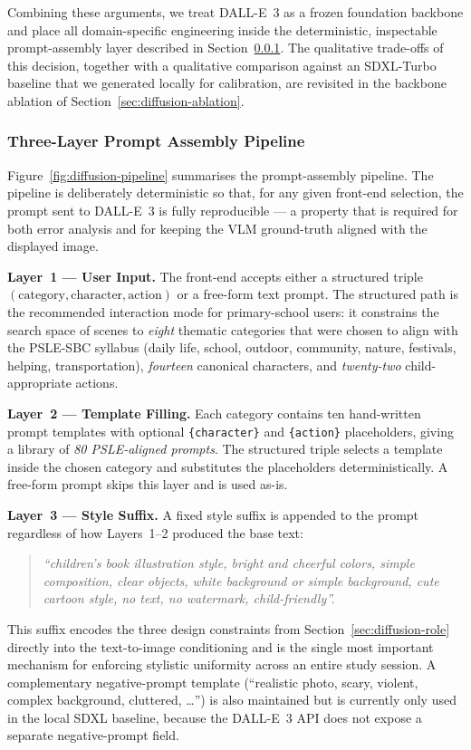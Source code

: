 \documentclass{article}
\begin{document}
Combining these arguments, we treat DALL-E~3 as a frozen foundation
backbone and place all domain-specific engineering inside the
deterministic, inspectable prompt-assembly layer described in
Section~\ref{sec:diffusion-pipeline}. The qualitative trade-offs of
this decision, together with a qualitative comparison against an
SDXL-Turbo~\cite{sauer2024sdxlturbo} baseline that we generated locally
for calibration, are revisited in the backbone ablation of
Section~\ref{sec:diffusion-ablation}.

\subsubsection{Three-Layer Prompt Assembly Pipeline}
\label{sec:diffusion-pipeline}

Figure~\ref{fig:diffusion-pipeline} summarises the prompt-assembly
pipeline. The pipeline is deliberately deterministic so that, for any
given front-end selection, the prompt sent to DALL-E~3 is fully
reproducible — a property that is required for both error analysis and
for keeping the VLM ground-truth aligned with the displayed image.

\noindent\textbf{Layer~1 — User Input.}
The front-end accepts either a structured triple
$(\text{category},\text{character},\text{action})$ or a free-form text
prompt. The structured path is the recommended interaction mode for
primary-school users: it constrains the search space of scenes to
\textit{eight} thematic categories that were chosen to align with the
PSLE-SBC syllabus (daily life, school, outdoor, community, nature,
festivals, helping, transportation), \textit{fourteen} canonical
characters, and \textit{twenty-two} child-appropriate actions.

\noindent\textbf{Layer~2 — Template Filling.}
Each category contains ten hand-written prompt templates with optional
\verb|{character}| and \verb|{action}| placeholders, giving a library of
\textit{80 PSLE-aligned prompts}. The structured triple selects a
template inside the chosen category and substitutes the placeholders
deterministically. A free-form prompt skips this layer and is used
as-is.

\noindent\textbf{Layer~3 — Style Suffix.}
A fixed style suffix is appended to the prompt regardless of how
Layers~1--2 produced the base text:
\begin{quote}\itshape
``children's book illustration style, bright and cheerful colors,
simple composition, clear objects, white background or simple
background, cute cartoon style, no text, no watermark, child-friendly''.
\end{quote}
This suffix encodes the three design constraints from
Section~\ref{sec:diffusion-role} directly into the text-to-image
conditioning and is the single most important mechanism for enforcing
stylistic uniformity across an entire study session. A complementary
negative-prompt template
(``realistic photo, scary, violent, complex background, cluttered,
\dots'') is also maintained but is currently only used in the local
SDXL baseline, because the DALL-E~3 API does not expose a separate
negative-prompt field.
\end{document}
